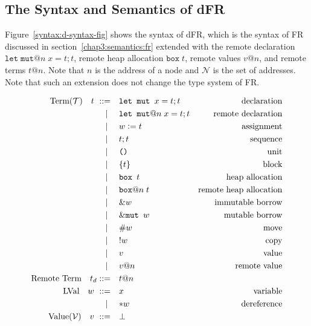 \subsection{The Syntax and Semantics of dFR} 
\label{chap3:semantics:dfr}
Figure~\ref{syntax:d-syntax-fig} shows the syntax of dFR, which is the syntax of FR discussed in section~\ref{chap3:semantics:fr} extended with the remote declaration $\texttt{let}\;\texttt{mut}@n\; x = t;t$, remote heap allocation $\texttt{box}\;t$, remote values $v@n$, and remote terms $t@n$. Note that $n$ is the address of a node and $\mathcal{N}$ is the set of addresses. Note that such an extension does not change the type system of FR.
\begin{figure}
\begin{alignat*}{3}
    \text{Term}(\mathcal{T}) \quad t \ \metaDeff \quad &\texttt{let mut } x = t;t &\text{declaration}\\
    \cmid \quad &\texttt{let mut}@n\; x = t;t &\text{remote declaration}\\
    \cmid \quad &w \metaDef t &\text{assignment}\\
    \cmid \quad &t;t &\text{sequence}\\
    \cmid \quad &\texttt{()} &\text{unit}\\
    \cmid \quad &\{t\} &\text{block}\\
    \cmid \quad &\texttt{box } t &\text{heap allocation}\\
    \cmid \quad &\texttt{box}@n\; t &\text{remote  heap allocation}\\
    \cmid \quad &\&w \quad &\text{immutable borrow} \\
    \cmid \quad &\&\texttt{mut } w \quad &\text{mutable borrow} \\
    \cmid \quad &\#{w} \quad &\text{move} \\
    \cmid \quad &!{w} \quad &\text{copy} \\
    \cmid \quad &v \quad &\text{value} \\
    \cmid \quad &v@n \quad &\text{remote value}\\
    \text{Remote Term} \quad t_d \metaDeff \quad &t@n\\
    \text{LVal} \quad w \ \metaDeff \quad &x \quad &\text{variable} \\
    \cmid \quad &{*}w \quad &\text{dereference} \\
    \text{Value}(\mathcal{V}) \quad v \ \metaDeff \quad &\bot\\ 

\end{alignat*}
\end{figure}
